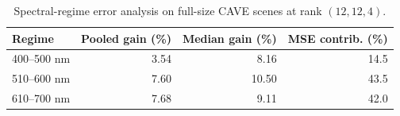 \begin{table}[!t]
  \centering
  \caption{Spectral-regime error analysis on full-size CAVE scenes at rank $(12,12,4)$.}
  \label{tab:error-regime-mechanism}
  \scriptsize
  \begin{tabular}{@{}lrrr@{}}
    \toprule
    Regime & Pooled gain (\%) & Median gain (\%) & MSE contrib. (\%) \\
    \midrule
    400--500 nm & 3.54 & 8.16 & 14.5 \\
    510--600 nm & 7.60 & 10.50 & 43.5 \\
    610--700 nm & 7.68 & 9.11 & 42.0 \\
    \bottomrule
  \end{tabular}
\end{table}
